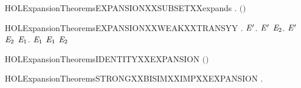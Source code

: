 \newcommand{\HOLExpansionTheoremsEXPANSIONXXIMPXXWEAKXXBISIM}{\UseVerbatim{HOLExpansionTheoremsEXPANSIONXXIMPXXWEAKXXBISIM}}
\begin{SaveVerbatim}{HOLExpansionTheoremsEXPANSIONXXSUBSETXXexpands}
\HOLTokenTurnstile{} \HOLSymConst{\HOLTokenForall{}}.   \HOLSymConst{\HOLTokenImp{}}   \ensuremath{(}\ensuremath{)}
\end{SaveVerbatim}
\newcommand{\HOLExpansionTheoremsEXPANSIONXXSUBSETXXexpands}{\UseVerbatim{HOLExpansionTheoremsEXPANSIONXXSUBSETXXexpands}}
\begin{SaveVerbatim}{HOLExpansionTheoremsEXPANSIONXXWEAKXXTRANSYY}
\HOLTokenTurnstile{} \HOLSymConst{\HOLTokenForall{}}.
         \HOLSymConst{\HOLTokenImp{}}
       \HOLSymConst{\HOLTokenForall{}} \ensuremath{\HOLBoundVar{E}\sp{\prime}}.
             \ensuremath{\HOLBoundVar{E}\sp{\prime}} \HOLSymConst{\HOLTokenImp{}}
           \HOLSymConst{\HOLTokenForall{}} \ensuremath{\HOLBoundVar{E}\sb{\mathrm{2}}}. \ensuremath{\HOLBoundVar{E}\sp{\prime}} \HOLTokenWeakTransBegin{}\HOLTokenWeakTransEnd \ensuremath{\HOLBoundVar{E}\sb{\mathrm{2}}} \HOLSymConst{\HOLTokenImp{}} \HOLSymConst{\HOLTokenExists{}}\ensuremath{\HOLBoundVar{E}\sb{\mathrm{1}}}.  \HOLTokenWeakTransBegin{}\HOLTokenWeakTransEnd \ensuremath{\HOLBoundVar{E}\sb{\mathrm{1}}} \HOLSymConst{\HOLTokenConj{}}  \ensuremath{\HOLBoundVar{E}\sb{\mathrm{1}}} \ensuremath{\HOLBoundVar{E}\sb{\mathrm{2}}}
\end{SaveVerbatim}
\newcommand{\HOLExpansionTheoremsEXPANSIONXXWEAKXXTRANSYY}{\UseVerbatim{HOLExpansionTheoremsEXPANSIONXXWEAKXXTRANSYY}}
\begin{SaveVerbatim}{HOLExpansionTheoremsIDENTITYXXEXPANSION}
\HOLTokenTurnstile{}  \ensuremath{(}\HOLSymConst{\ensuremath{=}}\ensuremath{)}
\end{SaveVerbatim}
\newcommand{\HOLExpansionTheoremsIDENTITYXXEXPANSION}{\UseVerbatim{HOLExpansionTheoremsIDENTITYXXEXPANSION}}
\begin{SaveVerbatim}{HOLExpansionTheoremsSTRONGXXBISIMXXIMPXXEXPANSION}
\HOLTokenTurnstile{} \HOLSymConst{\HOLTokenForall{}}.   \HOLSymConst{\HOLTokenImp{}}  
\end{SaveVerbatim}
